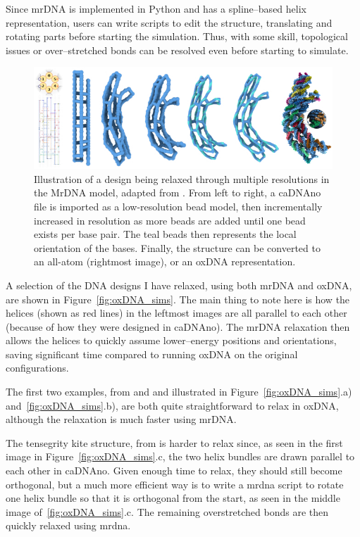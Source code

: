 Since mrDNA is implemented in Python and has a spline--based helix representation, users can write scripts to edit the structure, translating and rotating parts before starting the simulation. Thus, with some skill, topological issues or over--stretched bonds can be resolved even before starting to simulate.

\begin{figure}[ht]
  \begin{center}
    \includegraphics[width=\textwidth]{figures/mrDNA.jpg}
    \caption{Illustration of a design being relaxed through multiple resolutions in the MrDNA model, adapted from \cite{maffeo2019mrdna}. From left to right, a caDNAno file is imported as a low-resolution bead model, then incrementally increased in resolution as more beads are added until one bead exists per base pair. The teal beads then represents the local orientation of the bases. Finally, the structure can be converted to an all-atom (rightmost image), or an oxDNA representation.}
    \label{fig:mrdna}
  \end{center}
\end{figure}

A selection of the DNA designs I have relaxed, using both mrDNA and oxDNA, are shown in Figure~\ref{fig:oxDNA_sims}. The main thing to note here is how the helices (shown as red lines) in the leftmost images are all parallel to each other (because of how they were designed in caDNAno). The mrDNA relaxation then allows the helices to quickly assume lower--energy positions and orientations, saving significant time compared to running oxDNA on the original configurations.

The first two examples, from \cite{gerling2015dynamic} and \cite{zadegan2012smallbox} and illustrated in Figure~\ref{fig:oxDNA_sims}.a) and~\ref{fig:oxDNA_sims}.b), are both quite straightforward to relax in oxDNA, although the relaxation is much faster using mrDNA.

The tensegrity kite structure, from \cite{liedl2010_kite} is harder to relax since, as seen in the first image in Figure~\ref{fig:oxDNA_sims}.c, the two helix bundles are drawn parallel to each other in caDNAno. Given enough time to relax, they should still become orthogonal, but a much more efficient way is to write a mrdna script to rotate one helix bundle so that it is orthogonal from the start, as seen in the middle image of~\ref{fig:oxDNA_sims}.c. The remaining overstretched bonds are then quickly relaxed using mrdna.

